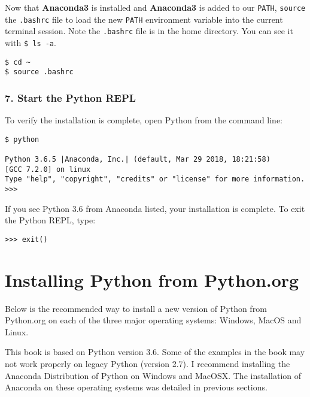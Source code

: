 \documentclass{book}
\newcommand{\passthrough}[1]{#1}
\begin{document}
Now that \textbf{Anaconda3} is installed and \textbf{Anaconda3} is added
to our \passthrough{\lstinline!PATH!}, \passthrough{\lstinline!source!}
the \passthrough{\lstinline!.bashrc!} file to load the new
\passthrough{\lstinline!PATH!} environment variable into the current
terminal session. Note the \passthrough{\lstinline!.bashrc!} file is in
the home directory. You can see it with
\passthrough{\lstinline!$ ls -a!}.

\begin{lstlisting}
$ cd ~
$ source .bashrc
\end{lstlisting}
    




    
        \hypertarget{start-the-python-repl}{%
\subsubsection{7. Start the Python REPL}\label{start-the-python-repl}}

To verify the installation is complete, open Python from the command
line:

\begin{lstlisting}
$ python

Python 3.6.5 |Anaconda, Inc.| (default, Mar 29 2018, 18:21:58)
[GCC 7.2.0] on linux
Type "help", "copyright", "credits" or "license" for more information.
>>>
\end{lstlisting}

If you see Python 3.6 from Anaconda listed, your installation is
complete. To exit the Python REPL, type:

\begin{lstlisting}
>>> exit()
\end{lstlisting}
    




    
        \hypertarget{installing-python-from-python.org}{%
\section{Installing Python from
Python.org}\label{installing-python-from-python.org}}
    




    
        Below is the recommended way to install a new version of Python from
Python.org on each of the three major operating systems: Windows, MacOS
and Linux.

This book is based on Python version 3.6. Some of the examples in the
book may not work properly on legacy Python (version 2.7). I recommend
installing the Anaconda Distribution of Python on Windows and MacOSX.
The installation of Anaconda on these operating systems was detailed in
previous sections.
    
\end{document}
